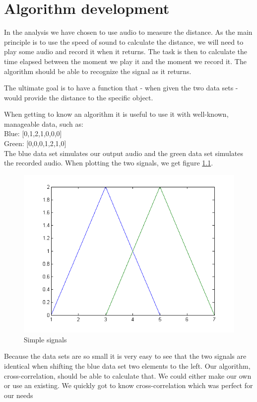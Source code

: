 \chapter{Algorithm development}
In the analysis we have chosen to use audio to measure the distance. As the main principle is to use the speed of sound to calculate the distance, we will need to play some audio and record it when it returns. The task is then to calculate the time elapsed between the moment we play it and the moment we record it. The algorithm should be able to recognize the signal as it returns. 

The ultimate goal is to have a function that - when given the two data sets - would provide the distance to the specific object.

When getting to know an algorithm it is useful to use it with well-known, manageable data, such as:
\\
Blue: [0,1,2,1,0,0,0]\\
Green: [0,0,0,1,2,1,0]\\
The blue data set simulates our output audio and the green data set simulates the recorded audio. When plotting the two signals, we get figure \ref{fig:xcrossSample}. 

\begin{figure}[H]
\centering
\includegraphics[scale=0.5]{billeder/sampleSignals.png}
\caption{Simple signals}
\label{fig:xcrossSample}
\end{figure} 

Because the data sets are so small it is very easy to see that the two signals are identical when shifting the blue data set two elements to the left. Our algorithm, cross-correlation, should be able to calculate that. We could either make our own or use an existing. We quickly got to know cross-correlation which was perfect for our needs

